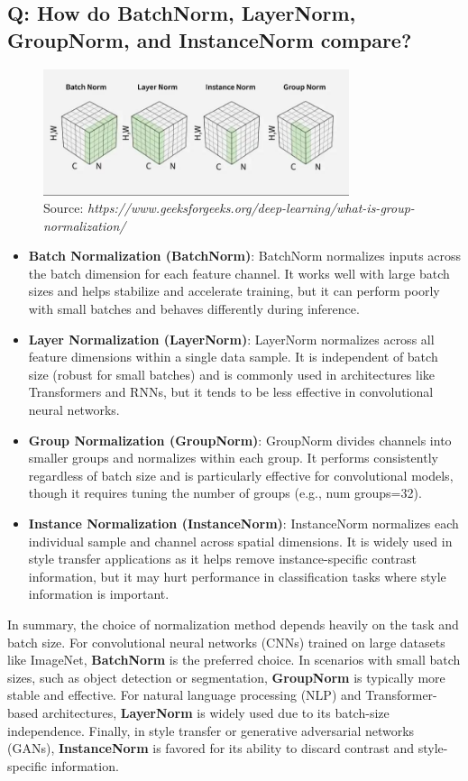 \subsection*{Q: How do BatchNorm, LayerNorm, GroupNorm, and InstanceNorm compare?}
\begin{figure}[H]
	\centering
	\includegraphics[width=0.8\textwidth]{norms.jpg}
	\caption{Source: \textit{https://www.geeksforgeeks.org/deep-learning/what-is-group-normalization/}}
\end{figure}
\begin{itemize}
	\item \textbf{Batch Normalization (BatchNorm)}: BatchNorm normalizes inputs across the batch dimension for each feature channel. It works well with large batch sizes and helps stabilize and accelerate training, but it can perform poorly with small batches and behaves differently during inference.
	\item \textbf{Layer Normalization (LayerNorm)}: LayerNorm normalizes across all feature dimensions within a single data sample. It is independent of batch size (robust for small batches) and is commonly used in architectures like Transformers and RNNs, but it tends to be less effective in convolutional neural networks.
	\item \textbf{Group Normalization (GroupNorm)}: GroupNorm divides channels into smaller groups and normalizes within each group. It performs consistently regardless of batch size and is particularly effective for convolutional models, though it requires tuning the number of groups (e.g., num groups=32).
	\item \textbf{Instance Normalization (InstanceNorm)}: InstanceNorm normalizes each individual sample and channel across spatial dimensions. It is widely used in style transfer applications as it helps remove instance-specific contrast information, but it may hurt performance in classification tasks where style information is important.
\end{itemize}

In summary, the choice of normalization method depends heavily on the task and batch size. For convolutional neural networks (CNNs) trained on large datasets like ImageNet, \textbf{BatchNorm} is the preferred choice. In scenarios with small batch sizes, such as object detection or segmentation, \textbf{GroupNorm} is typically more stable and effective. For natural language processing (NLP) and Transformer-based architectures, \textbf{LayerNorm} is widely used due to its batch-size independence. Finally, in style transfer or generative adversarial networks (GANs), \textbf{InstanceNorm} is favored for its ability to discard contrast and style-specific information.

